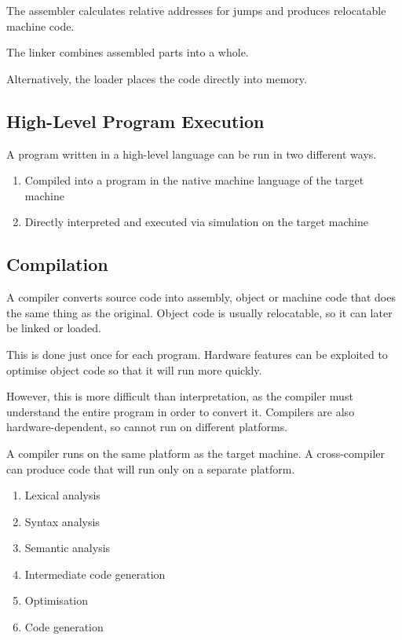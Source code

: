 The assembler calculates relative addresses for jumps and produces relocatable machine code.

The linker combines assembled parts into a whole.

Alternatively, the loader places the code directly into memory.

\subsection{High-Level Program Execution}

A program written in a high-level language can be run in two different ways.

\begin{enumerate}
  \item Compiled into a program in the native machine language of the target machine
  \item Directly interpreted and executed via simulation on the target machine
\end{enumerate}

\subsection{Compilation}

A compiler converts source code into assembly, object or machine code that does the same thing as the original.
Object code is usually relocatable, so it can later be linked or loaded.

This is done just once for each program.
Hardware features can be exploited to optimise object code so that it will run more quickly.

However, this is more difficult than interpretation, as the compiler must understand the entire program in order to convert it.
Compilers are also hardware-dependent, so cannot run on different platforms.

A compiler runs on the same platform as the target machine.
A cross-compiler can produce code that will run only on a separate platform.


\clearpage

\begin{enumerate}
  \item Lexical analysis
  \item Syntax analysis
  \item Semantic analysis
  \item Intermediate code generation
  \item Optimisation
  \item Code generation
\end{enumerate}

